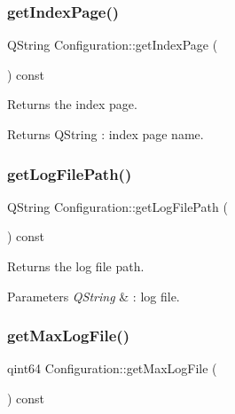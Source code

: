 \subsubsection{\texorpdfstring{get\+Index\+Page()}{getIndexPage()}}
{\footnotesize\ttfamily Q\+String Configuration\+::get\+Index\+Page (\begin{DoxyParamCaption}{ }\end{DoxyParamCaption}) const\hspace{0.3cm}{\ttfamily [inline]}}



Returns the index page. 

\begin{DoxyReturn}{Returns}
Q\+String \+: index page name. 
\end{DoxyReturn}
\mbox{\label{class_configuration_a005e1d10c605e08d73ff274f2b19fc48}} 
\subsubsection{\texorpdfstring{get\+Log\+File\+Path()}{getLogFilePath()}}
{\footnotesize\ttfamily Q\+String Configuration\+::get\+Log\+File\+Path (\begin{DoxyParamCaption}{ }\end{DoxyParamCaption}) const\hspace{0.3cm}{\ttfamily [inline]}}



Returns the log file path. 


\begin{DoxyParams}{Parameters}
{\em Q\+String} & \+: log file. \\
\hline
\end{DoxyParams}
\mbox{\label{class_configuration_a1b8f3f5dbc7fe7ff0b2ae20bf18e711b}} 
\subsubsection{\texorpdfstring{get\+Max\+Log\+File()}{getMaxLogFile()}}
{\footnotesize\ttfamily qint64 Configuration\+::get\+Max\+Log\+File (\begin{DoxyParamCaption}{ }\end{DoxyParamCaption}) const\hspace{0.3cm}{\ttfamily [inline]}}



